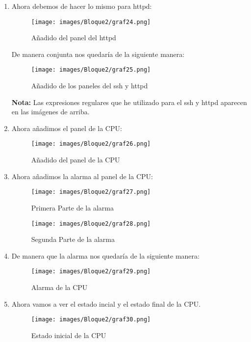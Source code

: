 \begin{enumerate}
    \item Ahora debemos de hacer lo mismo para httpd:
    \begin{figure}[H]
        \centering
        \texttt{[image: images/Bloque2/graf24.png]}
        \caption{Añadido del panel del httpd}
        \label{fig:panel_httpd}
    \end{figure}

    De manera conjunta nos quedaría de la siguiente manera:
    \begin{figure}[H]
        \centering
        \texttt{[image: images/Bloque2/graf25.png]}
        \caption{Añadido de los paneles del ssh y httpd}
        \label{fig:paneles_ssh_httpd}
    \end{figure}
    \textbf{Nota:} Las expresiones regulares que he utilizado para el ssh y httpd aparecen en las imágenes de arriba.
    \item Ahora añadimos el panel de la CPU:
    \begin{figure}[H]
        \centering
        \texttt{[image: images/Bloque2/graf26.png]}
        \caption{Añadido del panel de la CPU}
        \label{fig:panel_cpu}
    \end{figure}

    \item Ahora añadimos la alarma al panel de la CPU:
    \begin{figure}[H]
        \centering
        \begin{minipage}{0.45\textwidth}
            \centering
            \texttt{[image: images/Bloque2/graf27.png]} %
            \caption{Primera Parte de la alarma}
            \label{fig:image1graf}
        \end{minipage}
        \hfill
        \begin{minipage}{0.45\textwidth}
            \centering
            \texttt{[image: images/Bloque2/graf28.png]}
            \caption{Segunda Parte de la alarma}
            \label{fig:image2graf}
        \end{minipage}
    \end{figure}
    \item De manera que la alarma nos quedaría de la siguiente manera:
    \begin{figure}[H]
        \centering
        \texttt{[image: images/Bloque2/graf29.png]}
        \caption{Alarma de la CPU}
        \label{fig:alarma_cpu}
    \end{figure}
    \item Ahora vamos a ver el estado incial y el estado final de la CPU.
    \begin{figure}[H]
        \centering
        \texttt{[image: images/Bloque2/graf30.png]}
        \caption{Estado inicial de la CPU}
        \label{fig:estado_inicial_cpu}
    \end{figure}


\end{enumerate}
